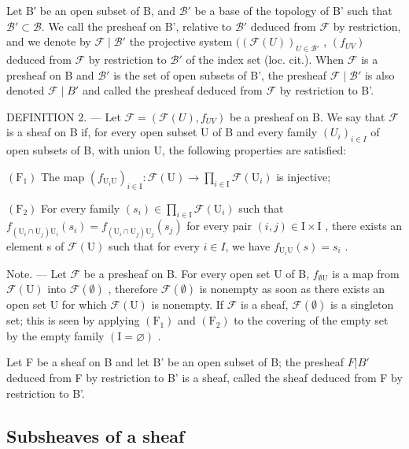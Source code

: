 Let B′ be an open subset of B, and \(\mathcal{B}'\) be a base of the topology of B' such that \(\mathcal{B}' \subset \mathcal{B}\). We call the presheaf on B', relative to \(\mathcal{B}'\) deduced from \(\mathcal{F}\) by restriction, and we denote by \(\mathcal{F} \mid \mathcal{B}'\) the projective system \(((\mathcal{F}(U))_{U \in \mathcal{B}'}\) , \((f_{UV})\) deduced from \(\mathcal{F}\) by restriction to \(\mathcal{B}'\) of the index set (loc. cit.). When \(\mathcal{F}\) is a presheaf on B and \(\mathcal{B}'\) is the set of open subsets of B', the presheaf \(\mathcal{F} \mid \mathcal{B}'\) is also denoted \(\mathcal{F} \mid B'\) and called the presheaf deduced from \(\mathcal{F}\) by restriction to B'.

DEFINITION 2. --- Let \(\mathcal{F} = (\mathcal{F}(U), f_{UV})\) be a presheaf on B. We say that \(\mathcal{F}\) is a sheaf on B if, for every open subset U of B and every family \((U_i)_{i \in I}\) of open subsets of B, with union U, the following properties are satisfied:

\((\mathrm{F}_{1})\) The map \((f_{\mathrm{U}_{i}\mathrm{U}})_{i\in\mathrm{I}}\colon\mathcal{F}(\mathrm{U})\to\prod_{i\in\mathrm{I}}\mathcal{F}(\mathrm{U}_{i})\) is injective;

\((\mathrm{F}_{2})\) For every family \((s_{i}) \in \prod_{i \in \mathrm{I}} \mathcal{F}(\mathrm{U}_{i})\) such that \(f_{(\mathrm{U}_{i} \cap \mathrm{U}_{j})\mathrm{U}_{i}}(s_{i}) = f_{(\mathrm{U}_{i} \cap \mathrm{U}_{j})\mathrm{U}_{j}}(s_{j})\) for every pair \((i, j) \in \mathrm{I} \times \mathrm{I}\) , there exists an element s of \(\mathcal{F}(\mathrm{U})\) such that for every \(i \in I\), we have \(f_{\mathrm{U}_{i}\mathrm{U}}(s) = s_{i}\) .

Note. --- Let \(\mathcal{F}\) be a presheaf on B. For every open set U of B, \(f_{\emptyset \mathrm{U}}\) is a map from \(\mathcal{F}(\mathrm{U})\) into \(\mathcal{F}(\emptyset)\) , therefore \(\mathcal{F}(\emptyset)\) is nonempty as soon as there exists an open set U for which \(\mathcal{F}(\mathrm{U})\) is nonempty. If \(\mathcal{F}\) is a sheaf, \(\mathcal{F}(\emptyset)\) is a singleton set; this is seen by applying \((\mathrm{F}_{1})\) and \((\mathrm{F}_{2})\) to the covering of the empty set by the empty family \((\mathrm{I}=\varnothing)\) .

Let F be a sheaf on B and let B' be an open subset of B; the presheaf \(F|B'\) deduced from F by restriction to B' is a sheaf, called the sheaf deduced from F by restriction to B'.

\subsection{Subsheaves of a sheaf}


